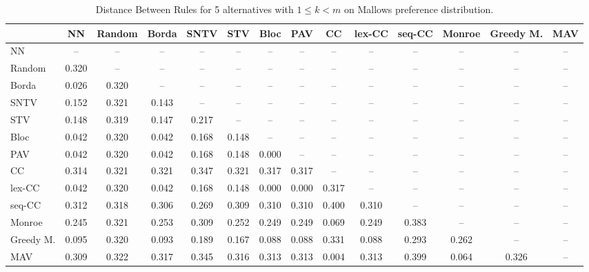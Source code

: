 
\begin{table*}
\centering
\begin{tabular}{lccccccccccccc}
\toprule
 & NN & Random & Borda & SNTV & STV & Bloc & PAV & CC & lex-CC & seq-CC & Monroe & Greedy M. & MAV \\
\midrule
NN & -- & -- & -- & -- & -- & -- & -- & -- & -- & -- & -- & -- & -- \\
Random & 0.320 & -- & -- & -- & -- & -- & -- & -- & -- & -- & -- & -- & -- \\
Borda & 0.026 & 0.320 & -- & -- & -- & -- & -- & -- & -- & -- & -- & -- & -- \\
SNTV & 0.152 & 0.321 & 0.143 & -- & -- & -- & -- & -- & -- & -- & -- & -- & -- \\
STV & 0.148 & 0.319 & 0.147 & 0.217 & -- & -- & -- & -- & -- & -- & -- & -- & -- \\
Bloc & 0.042 & 0.320 & 0.042 & 0.168 & 0.148 & -- & -- & -- & -- & -- & -- & -- & -- \\
PAV & 0.042 & 0.320 & 0.042 & 0.168 & 0.148 & 0.000 & -- & -- & -- & -- & -- & -- & -- \\
CC & 0.314 & 0.321 & 0.321 & 0.347 & 0.321 & 0.317 & 0.317 & -- & -- & -- & -- & -- & -- \\
lex-CC & 0.042 & 0.320 & 0.042 & 0.168 & 0.148 & 0.000 & 0.000 & 0.317 & -- & -- & -- & -- & -- \\
seq-CC & 0.312 & 0.318 & 0.306 & 0.269 & 0.309 & 0.310 & 0.310 & 0.400 & 0.310 & -- & -- & -- & -- \\
Monroe & 0.245 & 0.321 & 0.253 & 0.309 & 0.252 & 0.249 & 0.249 & 0.069 & 0.249 & 0.383 & -- & -- & -- \\
Greedy M. & 0.095 & 0.320 & 0.093 & 0.189 & 0.167 & 0.088 & 0.088 & 0.331 & 0.088 & 0.293 & 0.262 & -- & -- \\
MAV & 0.309 & 0.322 & 0.317 & 0.345 & 0.316 & 0.313 & 0.313 & 0.004 & 0.313 & 0.399 & 0.064 & 0.326 & -- \\
\bottomrule
\end{tabular}

\caption{Distance Between Rules for 5 alternatives with $1 \leq k < m$ on Mallows preference distribution.}
\end{table*}

